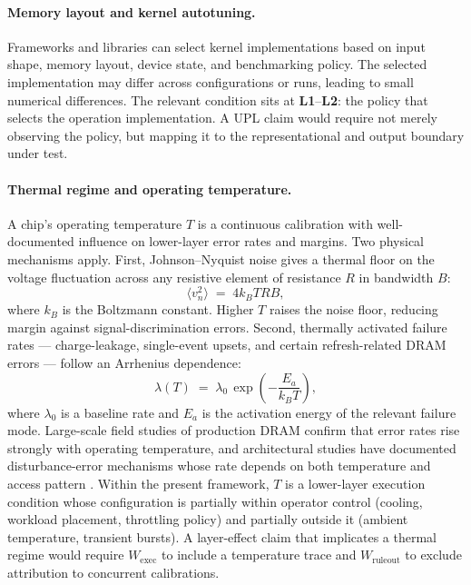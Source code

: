 \documentclass[11pt, a4paper]{article}
\theoremstyle{upldef}
\newcommand{\witness}[1]{\ensuremath{W_{\text{#1}}}}
\newcommand{\layer}[1]{\textbf{L#1}}
\begin{document}
\paragraph{Memory layout and kernel autotuning.}
Frameworks and libraries can select kernel implementations based on
input shape, memory layout, device state, and benchmarking policy.
The selected implementation may differ across configurations or
runs, leading to small numerical differences. The relevant condition
sits at \layer{1}--\layer{2}: the policy that selects the operation
implementation. A UPL claim would require not merely observing the
policy, but mapping it to the representational and output boundary
under test.

\paragraph{Thermal regime and operating temperature.}
A chip's operating temperature $T$ is a continuous calibration with
well-documented influence on lower-layer error rates and margins.
Two physical mechanisms apply. First, Johnson--Nyquist noise gives a
thermal floor on the voltage fluctuation across any resistive element
of resistance $R$ in bandwidth $B$:
\begin{equation}
\langle v_n^2 \rangle \;=\; 4 k_B T R B,
\label{eq:johnson}
\end{equation}
where $k_B$ is the Boltzmann constant. Higher $T$ raises the noise
floor, reducing margin against signal-discrimination errors. Second,
thermally activated failure rates --- charge-leakage,
single-event upsets, and certain refresh-related DRAM errors ---
follow an Arrhenius dependence:
\begin{equation}
\lambda(T) \;=\; \lambda_0 \, \exp\!\left(-\frac{E_a}{k_B T}\right),
\label{eq:arrhenius}
\end{equation}
where $\lambda_0$ is a baseline rate and $E_a$ is the activation
energy of the relevant failure mode. Large-scale field studies of
production DRAM \citep{schroeder2009} confirm that error rates rise
strongly with operating temperature, and architectural studies have
documented disturbance-error mechanisms whose rate depends on both
temperature and access pattern \citep{kim2014}. Within the present
framework, $T$ is a lower-layer execution condition whose
configuration is partially within operator control (cooling, workload
placement, throttling policy) and partially outside it (ambient
temperature, transient bursts). A layer-effect claim that implicates
a thermal regime would require $\witness{exec}$ to include a
temperature trace and $\witness{ruleout}$ to exclude attribution to
concurrent calibrations.
\end{document}
